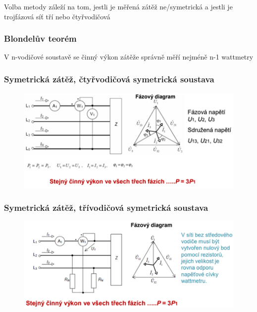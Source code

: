Volba  metody záleží na tom, jestli je měřená zátěž ne/symetrická a jestli je trojfázová síť tří nebo čtyřvodičová\\

\subsubsection*{Blondelův teorém}
V n-vodičové soustavě se činný výkon zátěže správně měří nejméně n-1 wattmetry

\subsubsection*{Symetrická zátěž, čtyřvodičová symetrická soustava}
\begin{figure}[H]
    \includegraphics*[scale = 1.2]{images/sym_4_sym.png}
\end{figure}


\subsubsection*{Symetrická zátěž, třívodičová symetrická soustava}
\begin{figure}[H]
    \includegraphics*[scale = 1.2]{images/sym_3_sym.png}
\end{figure}

